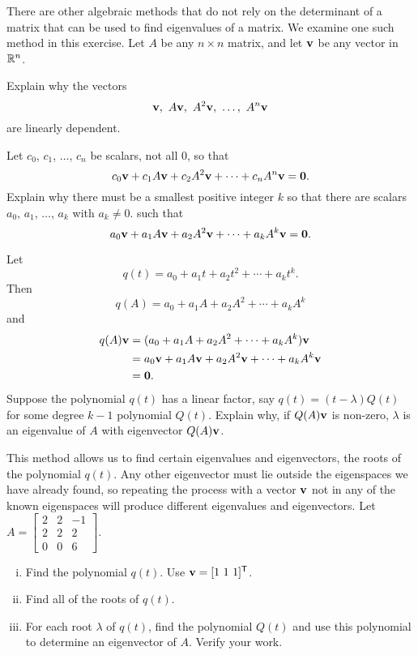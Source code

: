 \ea


\item There are other algebraic methods that do not rely on the determinant of a matrix that can be used to find eigenvalues of a matrix. We examine one such method in this exercise. Let $A$ be any $n \times n$ matrix, and let $\mathbf{v}$ be any vector in $\mathbb{R}^n$. 
	\ba
	\item Explain why the vectors  
\[\vv, \ A\vv, \ A^2\vv, \ \ldots, \ A^n\vv\]
are linearly dependent. 

	\item Let $c_0$, $c_1$, $\ldots$, $c_n$ be scalars, not all 0, so that  
\[c_0 \mathbf{v} + c_1 A\mathbf{v} + c_2 A^2 \mathbf{v} + \cdots + c_n A^n \mathbf{v} = \mathbf{0}.\]
Explain why there must be a smallest positive integer $k$ so that there are scalars $a_0$, $a_1$, $\ldots$, $a_k$ with $a_k \neq 0$. such that  
\[a_0 \mathbf{v} + a_1 A\mathbf{v} + a_2 A^2 \mathbf{v} + \cdots + a_k A^k \mathbf{v} = \mathbf{0}.\]

	\item Let 
\[q(t) = a_0 + a_1t + a_2t^2 + \cdots + a_kt^k.\]
Then
\[q(A) = a_0 + a_1A + a_2A^2 + \cdots + a_kA^k\]
and
\begin{align*}
q(A)\mathbf{v} &= (a_0 + a_1A + a_2A^2 + \cdots + a_kA^k)\mathbf{v} \\
	&= a_0 \mathbf{v} + a_1 A\mathbf{v} + a_2 A^2 \mathbf{v} + \cdots + a_k A^k \mathbf{v} \\
	&= \mathbf{0}.
\end{align*}
Suppose the polynomial $q(t)$ has a linear factor, say $q(t) = (t-\lambda)Q(t)$ for some degree $k-1$ polynomial $Q(t)$. Explain why, if $Q(A) \mathbf{v}$ is non-zero,  $\lambda$ is an eigenvalue of $A$ with eigenvector $Q(A) \mathbf{v}$. 

	\item This method allows us to find certain eigenvalues and eigenvectors, the roots of the polynomial $q(t)$. Any other eigenvector must lie outside the eigenspaces we have already found, so repeating the process with a vector $\mathbf{v}$ not in any of the known eigenspaces will produce different eigenvalues and eigenvectors. Let $A = \left[ \begin{array}{ccr} 2&2&-1 \\ 2&2&2 \\ 0&0&6 \end{array} \right]$.
	\begin{enumerate}[i.]
	\item Find the polynomial $q(t)$. Use $\mathbf{v} = [1 \ 1 \ 1]^{\mathsf{T}}$.
	\item Find all of the roots of $q(t)$.
	\item For each root $\lambda$ of $q(t)$, find the polynomial $Q(t)$ and use this polynomial to determine an eigenvector of $A$. Verify your work.
	\end{enumerate}
	\ea

